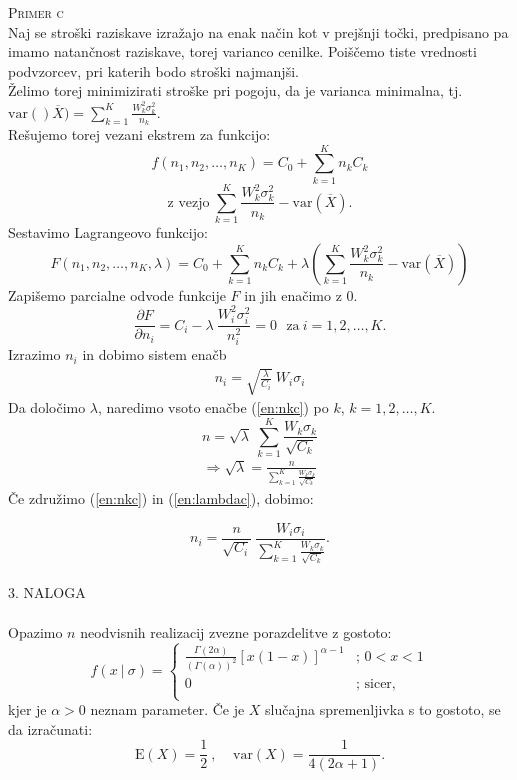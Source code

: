 \documentclass[a4paper,12pt]{article}
\begin{document}
\noindent
\textsc{Primer c}
\\
Naj se stroški raziskave izražajo na enak način kot v prejšnji točki, predpisano pa imamo natančnost raziskave, torej varianco cenilke. Poiščemo tiste vrednosti podvzorcev, pri katerih bodo stroški najmanjši.
\\
Želimo torej minimizirati stroške pri pogoju, da je varianca minimalna, tj. $ \text{var}()\overline{X}) = \sum_{k = 1}^{K} \frac{W_k^2 \sigma_k^2}{n_k}. $
\\
Rešujemo torej vezani ekstrem za funkcijo:
$$ f (n_1, n_2, \ldots, n_K) = C_0 + \sum_{k = 1}^{K} n_k C_k $$
$$ \text{z vezjo} \ \sum_{k = 1}^{K} \frac{W_k^2 \sigma_k^2}{n_k} - \text{var}(\overline{X}). $$
Sestavimo Lagrangeovo funkcijo:
$$ F (n_1, n_2, \ldots, n_K, \lambda) = C_0 + \sum_{k = 1}^{K} n_k C_k  + \lambda \left( \sum_{k = 1}^{K} \frac{W_k^2 \sigma_k^2}{n_k} - \text{var}(\overline{X}) \right)$$
Zapišemo parcialne odvode funkcije $F$ in jih enačimo z $0$.
$$ \frac{ \partial F}{\partial n_i} = C_i - \lambda \ \frac{W_i^2 \sigma_i^2}{n_i^2} = 0 \ \ \ \text{za} \ i = 1, 2, \ldots, K.  $$
Izrazimo $n_i$ in dobimo sistem enačb
\begin{align}\label{en:nkc}
n_i = \sqrt{\frac{\lambda}{C_i}} \ W_i \sigma_i
\end{align}
Da določimo $\lambda$, naredimo vsoto enačbe (\ref{en:nkc}) po $k$, $k = 1, 2, \ldots, K.$
$$ n = \sqrt{\lambda} \ \sum_{k = 1}^{K} \frac{W_k \sigma_k}{\sqrt{C_k}} $$
\begin{align}\label{en:lambdac}
\Rightarrow \sqrt{\lambda} = \frac{n}{\sum_{k = 1}^{K} \frac{W_k \sigma_k}{\sqrt{C_k}}}
\end{align}
Če združimo (\ref{en:nkc}) in (\ref{en:lambdac}), dobimo:

$$ n_i = \frac{n}{\sqrt{C_i}} \ \frac{W_i \sigma_i}{\sum_{k = 1}^{K} \frac{W_k \sigma_k}{\sqrt{C_k}}}. $$
\\


\noindent
\textsc{\large{3. NALOGA}}
\\
\\
Opazimo $n$ neodvisnih realizacij zvezne porazdelitve z gostoto:
\begin{displaymath}
    f(x \ | \ \sigma) = \left\{ \begin{array}{ll}
     \frac{\Gamma(2 \alpha)}{(\Gamma (\alpha))^2} \left[ x(1 - x) \right]^{\alpha - 1} & \textrm{; \ $0 < x < 1$}\\
     0 & \textrm{; \ sicer,} \\
    \end{array} \right. 
\end{displaymath}
kjer je $\alpha > 0$ neznam parameter. Če je $X$ slučajna spremenljivka s to gostoto, se da izračunati:
$$ \text{E}(X) = \frac{1}{2} \ , \ \ \ \ \ \text{var}(X) = \frac{1}{4(2 \alpha + 1)}. $$
\\
\end{document}
